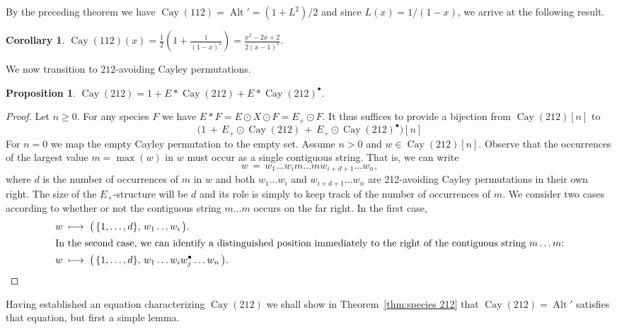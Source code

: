 \documentclass[a4paper, 11pt]{article}
\DeclareMathOperator{\Cay}{Cay}
\DeclareMathOperator{\Alt}{Alt}
\theoremstyle{definition}
\newtheorem{corollary}[theorem]{Corollary}
\newtheorem{proposition}[theorem]{Proposition}
\begin{document}
By the preceding theorem we have $\Cay(112)=\Alt'=(1+L^2)/2$ and since
$L(x)=1/(1-x)$, we arrive at the following result.

\begin{corollary}\label{prop:egf cay(112)}
  $\displaystyle \Cay(112)(x)
  = \frac{1}{2}\left(1+\frac{1}{(1-x)^2}\right)
  = \frac{x^2-2x+2}{2(x-1)^2}$.
\end{corollary}

We now transition to $212$-avoiding Cayley permutations.

\begin{proposition}\label{prop: species eq for Cay(212)}
  $\Cay(212) = 1 + E * \Cay(212) + E * \Cay(212)^{\bullet}$.
\end{proposition}

\begin{proof}
  Let $n\geq 0$.
  For any species $F$ we have $E*F = E\odot X \odot F = E_+ \odot F$. It
  thus suffices to provide a bijection from
  $\Cay(212)[n]$ to
  \[
    \bigl(1 \,+\, E_+\odot\Cay(212)  \,+\, E_+\odot\Cay(212)^{\bullet}\bigr)[n]
  \]
  For $n=0$ we map the empty Cayley permutation to the empty set. Assume
  $n>0$ and $w\in\Cay(212)[n]$. Observe
  that the occurrences of the largest value $m=\max(w)$ in $w$ must
  occur as a single contiguous string. That is, we can write
  \[
    w \,=\, w_1\ldots w_i m \ldots m w_{i+d+1} \ldots w_n,
  \]
  where $d$ is the number of occurrences of $m$ in $w$ and both
  $w_1 \ldots w_i$ and $w_{i+d+1} \ldots w_n$ are 212-avoiding Cayley
  permutations in their own right. The size of the $E_+$-structure will
  be $d$ and its role is simply to keep track of the number of occurrences of
  $m$. We consider two cases according to whether or
  not the contiguous string $m \ldots m$ occurs on the far right. In the
  first case,
  \begin{align*}
    w &\;\longmapsto\;
    \bigl(\,\{1,\dots,d\},\, w_1\ldots w_i\,\bigr). \\
    \intertext{In the second case, we can identify a distinguished position
    immediately to the right of the contiguous string $m \ldots m$:}
    w &\;\longmapsto\;
    \bigl(\,\{1,\dots,d\},\, w_1\ldots w_i w_j^{\bullet}\ldots w_n\,\bigr).\qedhere
  \end{align*}
\end{proof}

Having established an equation characterizing $\Cay(212)$ we shall show
in Theorem~\ref{thm:species 212} that $\Cay(212) = \Alt'$
satisfies that equation, but first a simple lemma.
\end{document}
